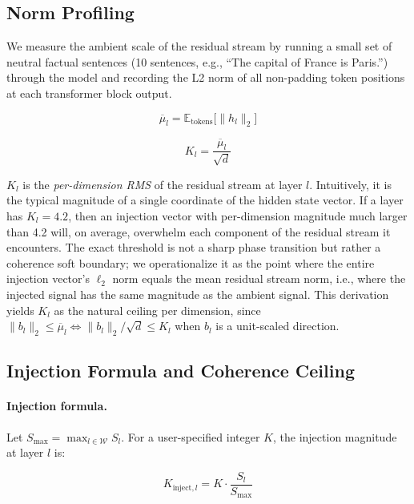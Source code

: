 \documentclass[10pt]{article}
\begin{document}
\subsection{Norm Profiling}
\label{sec:method:norm}

We measure the ambient scale of the residual stream by running a small set of
neutral factual sentences (10 sentences, e.g., ``The capital of France is
Paris.'') through the model and recording the L2 norm of all non-padding token
positions at each transformer block output.

\begin{equation}
  \overline{\mu}_l = \mathbb{E}_{\text{tokens}}\bigl[\|h_l\|_2\bigr]
  \label{eq:mu}
\end{equation}

\begin{equation}
  K_l = \frac{\overline{\mu}_l}{\sqrt{d}}
  \label{eq:Kl}
\end{equation}

$K_l$ is the \emph{per-dimension RMS} of the residual stream at layer $l$.
Intuitively, it is the typical magnitude of a single coordinate of the hidden
state vector.  If a layer has $K_l = 4.2$, then an injection vector with
per-dimension magnitude much larger than 4.2 will, on average, overwhelm each
component of the residual stream it encounters.  The exact threshold is not a
sharp phase transition but rather a coherence soft boundary; we operationalize
it as the point where the entire injection vector's $\ell_2$ norm equals the
mean residual stream norm, i.e., where the injected signal has the same
magnitude as the ambient signal.  This derivation yields $K_l$ as the natural
ceiling per dimension, since $\|b_l\|_2 \leq \overline{\mu}_l \Leftrightarrow
\|b_l\|_2 / \sqrt{d} \leq K_l$ when $b_l$ is a unit-scaled direction.

\subsection{Injection Formula and Coherence Ceiling}
\label{sec:method:formula}

\paragraph{Injection formula.}
Let $S_\text{max} = \max_{l \in \mathcal{W}} S_l$.  For a user-specified
integer $K$, the injection magnitude at layer $l$ is:

\begin{equation}
  K_{\text{inject},l} = K \cdot \frac{S_l}{S_\text{max}}
  \label{eq:Kinject}
\end{equation}
\end{document}
